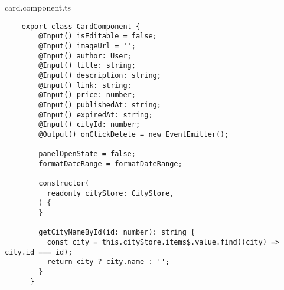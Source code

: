 card.component.ts
\begin{lstlisting}
    export class CardComponent {
        @Input() isEditable = false;
        @Input() imageUrl = '';
        @Input() author: User;
        @Input() title: string;
        @Input() description: string;
        @Input() link: string;
        @Input() price: number;
        @Input() publishedAt: string;
        @Input() expiredAt: string;
        @Input() cityId: number;
        @Output() onClickDelete = new EventEmitter();
      
        panelOpenState = false;
        formatDateRange = formatDateRange;
      
        constructor(
          readonly cityStore: CityStore, 
        ) {
        }
      
        getCityNameById(id: number): string {
          const city = this.cityStore.items$.value.find((city) => city.id === id);
          return city ? city.name : '';
        }
      }      
\end{lstlisting}


\fi
